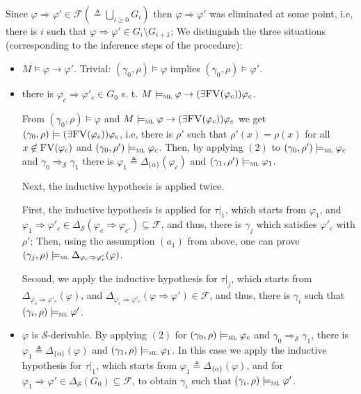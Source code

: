 \documentclass[conference]{IEEEtran}
\newcommand{\M}{\mathit{M}}
\newcommand{\eqbydef}{\triangleq}
\newcommand{\F}{\mathcal{F}}
\renewcommand{\S}{\mathcal{S}}
\newcommand{\tran}[2]{\Ra^{\!#1}_{\!#2}}
\newcommand{\Ra}{\Rightarrow}
\newcommand{\FreeVars}{\mathit{\textsc{FV}}}
\renewcommand{\implies}{\rightarrow}
\newcommand{\ML}{\textsc{ml}\xspace}
\newcommand{\rrule}[2]{{#1} \Ra{#2}}
\newcommand{\rarule}[2]{{#1} \Ra{#2}}
\newcommand{\modelsml}{\models_\ML}
\begin{document}
Since $\rrule{\varphi}{\varphi'}\in\F (\eqbydef \bigcup_{i\geq 0}G_i)$ then $\rrule{\varphi}{\varphi'}$ was eliminated at some point, i.e, there is $i$ such that  $\rrule{\varphi}{\varphi'} \in G_i \setminus G_{i+1}$; We distinguish the three situations (corresponding to the inference steps of the procedure):
\begin{itemize}
\item $\M \models \varphi \implies \varphi'$. 
Trivial:  $(\gamma_0, \rho) \models \varphi$ implies $(\gamma_0, \rho) \models \varphi'$.
\item there is $ \rarule{\varphi_c}{\varphi'_c} \in G_0$ s. t. $M\modelsml\varphi\implies (\exists\FreeVars(\varphi_c))\varphi_c$. 

From $(\gamma_0, \rho) \models \varphi$ and $M\modelsml\varphi\implies (\exists\FreeVars(\varphi_c))\varphi_c$ we get $(\gamma_0, \rho) \models (\exists\FreeVars(\varphi_c))\varphi_c$, i.e, there is $\rho'$ such that $\rho'(x) = \rho(x)$ for all $x \not\in \FreeVars(\varphi_c)$ and $(\gamma_0, \rho') \modelsml\varphi_c$.
Then, by applying $(2)$ to $(\gamma_0, \rho') \modelsml\varphi_c$ and $\gamma_0 \tran{}{\S} \gamma_1$ there is $\varphi_1 \eqbydef \Delta_{\{\alpha\}}(\varphi_{c})$ and $(\gamma_1, \rho')\modelsml\varphi_1$.

Next,  the inductive hypothesis is applied twice.

First, the inductive hypothesis is applied for $\tau|_1$, which starts from $\varphi_1$,  and $\rrule{\varphi_1}{\varphi'_c} \in \Delta_\S(\rrule{\varphi_{c}}{\varphi_{c'}}) \subseteq \F$, and thus, there is $\gamma_j$ which satisfies $\varphi'_c$ with $\rho'$;
Then, using the assumption $(a_1)$ from above, one can prove $(\gamma_j, \rho) \modelsml\Delta_{\rrule{\varphi_c}{\varphi'_c}}(\varphi)$.

Second, we apply the inductive hypothesis for $\tau|_j$, which starts from $\Delta_{\rrule{\varphi_c}{\varphi'_c}}(\varphi)$, and $\Delta_{\rrule{\varphi_c}{\varphi'_c}}(\rrule{\varphi}{\varphi'}) \in \F$,  and thus, there is $\gamma_i$ such that $(\gamma_i, \rho)\modelsml \varphi'$.
\item $\varphi$ is $\S$-derivable. 
By applying $(2)$ for $(\gamma_0, \rho) \modelsml\varphi_c$ and $\gamma_0 \tran{}{\S} \gamma_1$, there is $\varphi_1 \eqbydef \Delta_{\{\alpha\}}(\varphi)$ and $(\gamma_1, \rho)\modelsml\varphi_1$.
In this case we apply the inductive hypothesis for $\tau|_1$, which starts from  $\varphi_1 \eqbydef \Delta_{\{\alpha\}}(\varphi)$, and for $\rrule{\varphi_1}{\varphi'} \in \Delta_\S(G_0) \subseteq \F$, to obtain $\gamma_i$ such that $(\gamma_i, \rho)\modelsml \varphi'$.
\end{itemize}
\end{document}

